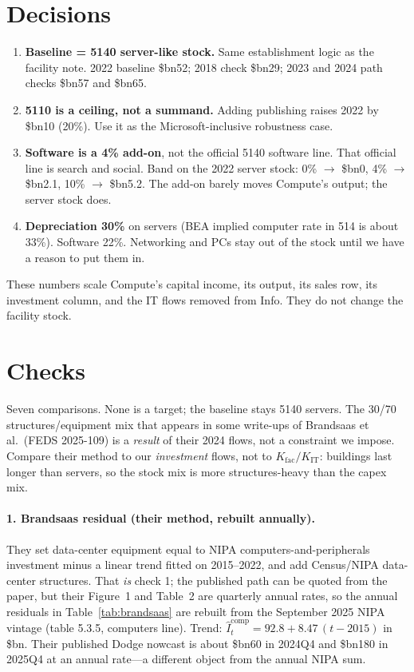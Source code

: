\documentclass[11pt]{article}
\newcommand{\bn}{\$bn}
\begin{document}
\section{Decisions}

\begin{enumerate}
\item \textbf{Baseline = 5140 server-like stock.} Same establishment logic as the facility note. 2022 baseline \bn52; 2018 check \bn29; 2023 and 2024 path checks \bn57 and \bn65.
\item \textbf{5110 is a ceiling, not a summand.} Adding publishing raises 2022 by \bn10 (20\%). Use it as the Microsoft-inclusive robustness case.
\item \textbf{Software is a 4\% add-on}, not the official 5140 software line. That official line is search and social. Band on the 2022 server stock: 0\% $\rightarrow$ \bn0, 4\% $\rightarrow$ \bn2.1, 10\% $\rightarrow$ \bn5.2. The add-on barely moves Compute's output; the server stock does.
\item \textbf{Depreciation 30\%} on servers (BEA implied computer rate in 514 is about 33\%). Software 22\%. Networking and PCs stay out of the stock until we have a reason to put them in.
\end{enumerate}

These numbers scale Compute's capital income, its output, its sales row, its investment column, and the IT flows removed from Info. They do not change the facility stock.

\section{Checks}
\label{sec:checks}

Seven comparisons. None is a target; the baseline stays 5140 servers. The 30/70 structures/equipment mix that appears in some write-ups of Brandsaas et al.\ (FEDS 2025-109) is a \emph{result} of their 2024 flows, not a constraint we impose. Compare their method to our \emph{investment} flows, not to $K_{\mathrm{fac}}/K_{\mathrm{IT}}$: buildings last longer than servers, so the stock mix is more structures-heavy than the capex mix.

\paragraph{1. Brandsaas residual (their method, rebuilt annually).}
They set data-center equipment equal to NIPA computers-and-peripherals investment minus a linear trend fitted on 2015--2022, and add Census/NIPA data-center structures. That \emph{is} check 1; the published path can be quoted from the paper, but their Figure~1 and Table~2 are quarterly annual rates, so the annual residuals in Table~\ref{tab:brandsaas} are rebuilt from the September 2025 NIPA vintage (table 5.3.5, computers line). Trend: $\hat I^{\mathrm{comp}}_t = 92.8 + 8.47\,(t-2015)$ in \bn. Their published Dodge nowcast is about \bn60 in 2024Q4 and \bn180 in 2025Q4 at an annual rate---a different object from the annual NIPA sum.
\end{document}
